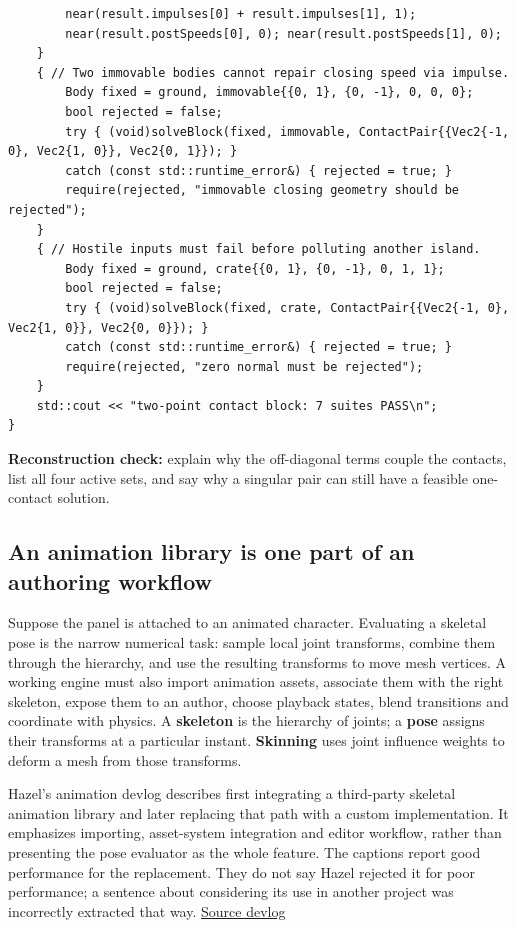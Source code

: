\begin{verbatim}
        near(result.impulses[0] + result.impulses[1], 1);
        near(result.postSpeeds[0], 0); near(result.postSpeeds[1], 0);
    }
    { // Two immovable bodies cannot repair closing speed via impulse.
        Body fixed = ground, immovable{{0, 1}, {0, -1}, 0, 0, 0};
        bool rejected = false;
        try { (void)solveBlock(fixed, immovable, ContactPair{{Vec2{-1, 0}, Vec2{1, 0}}, Vec2{0, 1}}); }
        catch (const std::runtime_error&) { rejected = true; }
        require(rejected, "immovable closing geometry should be rejected");
    }
    { // Hostile inputs must fail before polluting another island.
        Body fixed = ground, crate{{0, 1}, {0, -1}, 0, 1, 1};
        bool rejected = false;
        try { (void)solveBlock(fixed, crate, ContactPair{{Vec2{-1, 0}, Vec2{1, 0}}, Vec2{0, 0}}); }
        catch (const std::runtime_error&) { rejected = true; }
        require(rejected, "zero normal must be rejected");
    }
    std::cout << "two-point contact block: 7 suites PASS\n";
}
\end{verbatim}

\textbf{Reconstruction check:} explain why the off-diagonal terms couple the contacts, list all four active sets, and say why a singular pair can still have a feasible one-contact solution.

\subsection{An animation library is one part of an authoring workflow}\label{06-engine-ii-ch040-an-animation-library-is-one-part-of-an-authoring-workflow}

Suppose the panel is attached to an animated character. Evaluating a skeletal pose is the narrow numerical task: sample local joint transforms, combine them through the hierarchy, and use the resulting transforms to move mesh vertices. A working engine must also import animation assets, associate them with the right skeleton, expose them to an author, choose playback states, blend transitions and coordinate with physics. A \textbf{skeleton} is the hierarchy of joints; a \textbf{pose} assigns their transforms at a particular instant. \textbf{Skinning} uses joint influence weights to deform a mesh from those transforms.

Hazel's animation devlog describes first integrating a third-party skeletal animation library and later replacing that path with a custom implementation. It emphasizes importing, asset-system integration and editor workflow, rather than presenting the pose evaluator as the whole feature. The captions report good performance for the replacement. They do not say Hazel rejected it for poor performance; a sentence about considering its use in another project was incorrectly extracted that way. \href{https://www.youtube.com/watch?v=HPZo1oFESYQ}{Source devlog}

